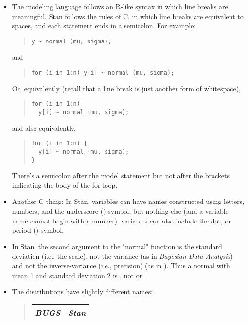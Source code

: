 \begin{itemize}
\item The \BUGS modeling language follows an R-like syntax in which
  line breaks are meaningful.  Stan follows the rules of C, in which
  line breaks are equivalent to spaces, and each statement ends in a
  semicolon.  For example:
%
\begin{quote}
\begin{Verbatim}
y ~ normal (mu, sigma);
\end{Verbatim}
\end{quote}
%
and
%
\begin{quote}
\begin{Verbatim}
for (i in 1:n) y[i] ~ normal (mu, sigma);
\end{Verbatim}
\end{quote}
%
Or, equivalently (recall that a line break is just another form of whitespace),
%
\begin{quote}
\begin{Verbatim}
for (i in 1:n)
  y[i] ~ normal (mu, sigma);
\end{Verbatim}
\end{quote}
%
and also equivalently, 
%
\begin{quote}
\begin{Verbatim}
for (i in 1:n) {
  y[i] ~ normal (mu, sigma);
}
\end{Verbatim}
\end{quote}
%
There's a semicolon after the model statement but not after the
brackets indicating the body of the for loop.
%
\item Another C thing: In Stan, variables can have names constructed
  using letters, numbers, and the underscore (\code{\_}) symbol, but
  nothing else (and a variable name cannot begin with a number).
  \BUGS variables can also include the dot, or period () symbol.
%
\item In Stan, the second argument to the "normal" function is the
  standard deviation (i.e., the scale), not the variance (as in {\it
    Bayesian Data Analysis}) and not the inverse-variance (i.e.,
  precision) (as in \BUGS).  Thus a normal with mean 1 and standard
  deviation 2 is , not  or
  .
%
\item
The distributions have slightly different names:
%
\begin{quote}
\begin{tabular}{l|l}
{\it BUGS} & {\it Stan} \\ \hline \hline

\end{tabular}
\end{quote}
\end{itemize}
